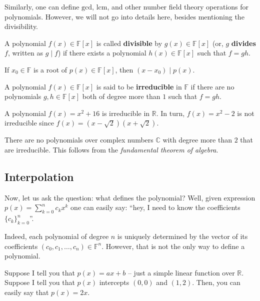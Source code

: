 \documentclass[../lecture-notes.tex]{subfiles}
\begin{document}
Similarly, one can define $\text{gcd}$, $\text{lcm}$, and other number field theory operations for polynomials. However, we will not go into details here, besides mentioning the divisibility.

\begin{definition}
    A polynomial $f(x) \in \mathbb{F}[x]$ is called \textbf{divisible} by $g(x) \in \mathbb{F}[x]$ (or, $g$ \textbf{divides} $f$, written as $g \mid f$) if there exists a polynomial $h(x) \in \mathbb{F}[x]$ such that $f=gh$.
\end{definition}

\begin{theorem}
    If $x_0 \in \mathbb{F}$ is a root of $p(x) \in \mathbb{F}[x]$, then $(x-x_0) \mid p(x)$.
\end{theorem}

\begin{definition}
    A polynomial $f(x) \in \mathbb{F}[x]$ is said to be \textbf{irreducible} in $\mathbb{F}$ if there are no polynomials $g,h \in \mathbb{F}[x]$ both of degree more than $1$ such that $f = gh$.
\end{definition}

\begin{example}
    A polynomial $f(x) = x^2+16$ is irreducible in $\mathbb{R}$. In turn, $f(x) = x^2-2$ is not irreducible since $f(x) = (x-\sqrt{2})(x+\sqrt{2})$. 
\end{example}

\begin{example}
    There are no polynomials over complex numbers $\mathbb{C}$ with degree more than $2$ that are irreducible. This follows from the \textit{fundamental theorem of algebra}.
\end{example}

\subsection{Interpolation}

Now, let us ask the question: what defines the polynomial? Well, given expression $p(x) = \sum_{k=0}^n c_kx^k$ one can easily say: ``hey, I need to know the coefficients $\{c_k\}_{k=0}^n$''.

Indeed, each polynomial of degree $n$ is uniquely determined by the vector of its coefficients $(c_0,c_1,\dots,c_n) \in \mathbb{F}^n$. However, that is not the only way to define a polynomial.

Suppose I tell you that $p(x) = ax + b$ -- just a simple linear function over $\mathbb{R}$. Suppose I tell you that $p(x)$ intercepts $(0,0)$ and $(1,2)$. Then, you can easily say that $p(x) = 2x$. 
\end{document}
